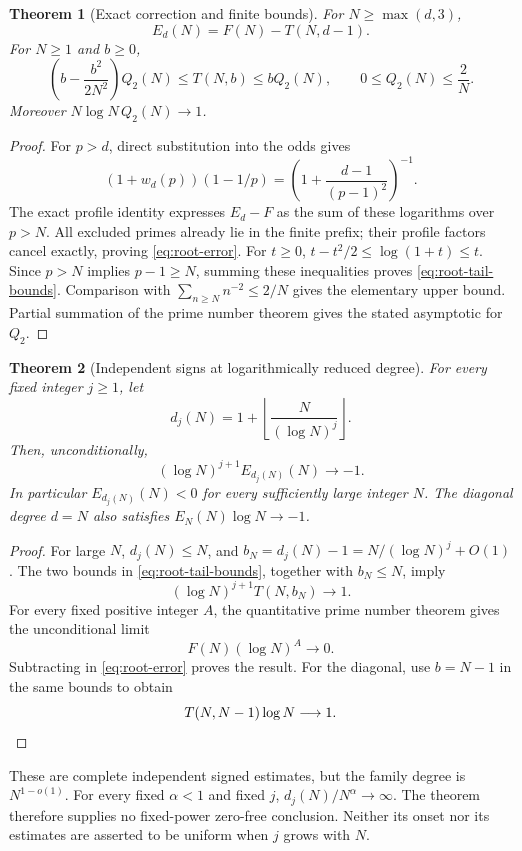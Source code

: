 \documentclass[11pt]{article}
\newtheorem{theorem}{Theorem}[section]
\theoremstyle{definition}
\begin{document}
\begin{theorem}[Exact correction and finite bounds]\label{thm:root-exact}
For $N\ge\max(d,3)$,
\begin{equation}\label{eq:root-error}
 E_d(N)=F(N)-T(N,d-1).
\end{equation}
For $N\ge1$ and $b\ge0$,
\begin{equation}\label{eq:root-tail-bounds}
 \left(b-\frac{b^2}{2N^2}\right)Q_2(N)
 \le T(N,b)\le bQ_2(N),\qquad 0\le Q_2(N)\le\frac2N.
\end{equation}
Moreover $N\log N\,Q_2(N)\to1$.
\end{theorem}
\begin{proof}
For $p>d$, direct substitution into the odds gives
\[
 (1+w_d(p))(1-1/p)
   =\left(1+\frac{d-1}{(p-1)^2}\right)^{-1}.
\]
The exact profile identity expresses $E_d-F$ as the sum of these
logarithms over $p>N$. All excluded primes already lie in the finite
prefix; their profile factors cancel exactly, proving
\eqref{eq:root-error}. For $t\ge0$,
$t-t^2/2\le\log(1+t)\le t$. Since $p>N$ implies $p-1\ge N$,
summing these inequalities proves \eqref{eq:root-tail-bounds}.
Comparison with $\sum_{n\ge N}n^{-2}\le2/N$ gives the elementary
upper bound. Partial summation of the prime number theorem gives
the stated asymptotic for $Q_2$.
\end{proof}

\begin{theorem}[Independent signs at logarithmically reduced degree]
\label{thm:log-root-sign}
For every fixed integer $j\ge1$, let
\[
 d_j(N)=1+\left\lfloor\frac{N}{(\log N)^j}\right\rfloor .
\]
Then, unconditionally,
\[
 (\log N)^{j+1}E_{d_j(N)}(N)\longrightarrow-1.
\]
In particular $E_{d_j(N)}(N)<0$ for every sufficiently large integer
$N$. The diagonal degree $d=N$ also satisfies
$E_N(N)\log N\to-1$.
\end{theorem}
\begin{proof}
For large $N$, $d_j(N)\le N$, and
$b_N=d_j(N)-1=N/(\log N)^j+O(1)$. The two bounds in
\eqref{eq:root-tail-bounds}, together with $b_N\le N$, imply
\[
 (\log N)^{j+1}T(N,b_N)\longrightarrow1.
\]
For every fixed positive integer $A$, the quantitative prime number
theorem gives the unconditional limit
\[
 F(N)(\log N)^A\longrightarrow0.
\]
Subtracting in \eqref{eq:root-error} proves the result.
For the diagonal, use $b=N-1$ in the same bounds to obtain
\[
 T(N,N-1)\log N\longrightarrow1. \qedhere
\]
\end{proof}
These are complete independent signed estimates, but the family degree
is $N^{1-o(1)}$. For every fixed $\alpha<1$ and fixed $j$,
$d_j(N)/N^\alpha\to\infty$. The theorem therefore supplies no
fixed-power zero-free conclusion. Neither its onset nor its estimates
are asserted to be uniform when $j$ grows with $N$.
\end{document}
